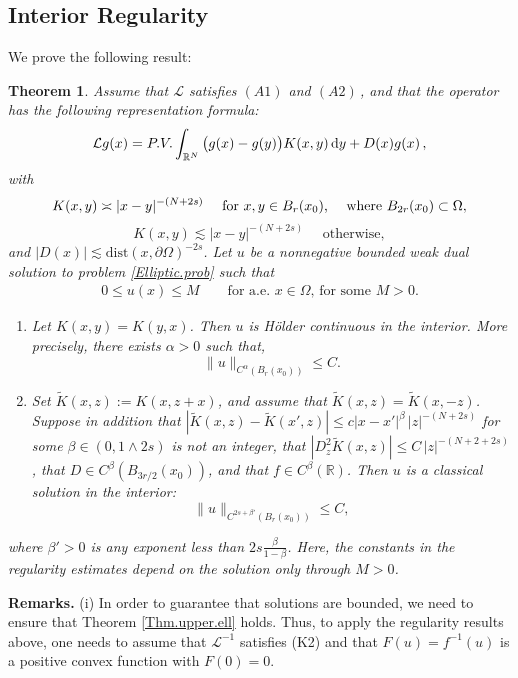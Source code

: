 \documentclass[11pt]{article}
\newtheorem{thm}{Theorem}[section]
\numberwithin{equation}{section}
\newcommand{\dy}{\,{\rm d}y}
\newcommand{\A}{\mathcal{L}}
\newcommand{\AI}{\mathcal{L}^{-1}}
\newcommand{\n}{F}
\newcommand{\RR}{\mathbb{R}}
\def\dist{\mathrm{dist}} %
\begin{document}
\subsection{Interior Regularity}
We prove the following result:
\begin{thm}\label{thm.regularity.1}Assume that $\A$ satisfies  $(A1)$ and $(A2)$\,, and that the operator has the following representation formula:
\begin{equation*}%
\A g(x)=P.V.\int_{\RR^N}\big(g(x)-g(y)\big)K(x,y)\dy+ D(x)g(x)\,,
\end{equation*}
with
$$
K(x,y)\asymp |x-y|^{-(N+2s)}\quad \text{ for $x,y\in B_r(x_0)$, \, \, where $B_{2r}(x_0)\subset \Omega$},
$$
$$
K(x,y)\lesssim |x-y|^{-(N+2s)}\quad \text{ otherwise},
$$
and $|D(x)|\lesssim \dist(x,\partial\Omega)^{-2s}$.
Let $u$ be a nonnegative bounded weak dual solution to problem \eqref{Elliptic.prob} such that
\begin{align*}
0\leq u(x)\leq M\qquad\mbox{for a.e. $x\in \Omega$, for some $M>0$.}
\end{align*}
\begin{enumerate}[leftmargin=*]
\item[(i)] Let $K(x,y)=K(y,x)$. Then $u$ is {H\"older continuous in the interior}. More precisely, there exists $\alpha>0$ such that,
\begin{equation}\label{thm.regularity.1.bounds.0}
    \|u\|_{C^{\alpha}(B_{r}(x_0))}\leq C.
\end{equation}
\item[(ii)]
Set $\tilde K(x,z):=K(x,z+x)$, and
assume that $\tilde K(x,z)=\tilde K(x,-z)$. Suppose
in addition that
$|\tilde K(x,z)-\tilde K(x',z)|\le c |x-x'|^\beta\,|z|^{-(N+2s)}$ for some $\beta\in (0,1\wedge 2s)$  is not an integer,
that $|D^2_z\tilde K(x,z)|\le C\,|z|^{-(N+2+2s)}$, that $D\in C^\beta(B_{3r/2}(x_0))$, and that $f\in C^\beta(\RR)$.  Then $u$ is a classical solution in the interior:
\begin{equation}\label{thm.regularity.1.bounds.1}
\|u\|_{C^{2s+\beta'}(B_{r}(x_0))}\le C,
\end{equation}
\end{enumerate}
where $\beta'>0$ is any exponent less than $2s\frac{\beta}{1-\beta}$.
Here, the constants in the regularity estimates depend on the solution only through $M>0$.
\end{thm}


\noindent\textbf{Remarks. }(i) In order to guarantee that solutions are  bounded, we need to ensure that Theorem \ref{Thm.upper.ell} holds.
Thus, to apply the regularity results above, one needs to assume that $\AI$ satisfies (K2)
and that $\n(u)=f^{-1}(u)$ is a positive convex function with $F(0)=0$.
\end{document}
